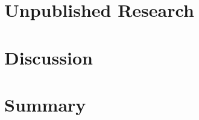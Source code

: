\documentclass[letterpaper,11pt]{report}
\newcounter{insertpages}
\begin{document}


\chapter{Unpublished Research}\label{ch:unpublished-research}


\clearpage

\chapter{Discussion}\label{ch:discussion}


\chapter{Summary}\label{ch:summary}


\end{document}
